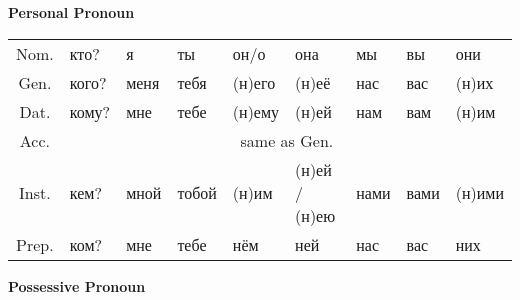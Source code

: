 \documentclass[a4paper, landscape, 11pt]{article}
\begin{document}
\strut\vfil

\begin{center}
	\Huge\bfseries Personal Pronoun
\end{center}

\begin{tabularx}{\textwidth}{|c|X|X|X|X|X|X|X|X|}
	\hline
	Nom. & кто?  & я    & ты    & он/о   & она           & мы   & вы   & они    \\ %
	Gen. & кого? & меня & тебя  & (н)его & (н)её         & нас  & вас  & (н)их  \\ %
	Dat. & кому? & мне  & тебе  & (н)ему & (н)ей         & нам  & вам  & (н)им  \\ \cline{2-9}
	Acc. &                      \multicolumn{8}{c|}{same as Gen.}                      \\ \cline{2-9}
	Inst. & кем?  & мной & тобой & (н)им  & (н)ей / (н)ею & нами & вами & (н)ими \\ %
	Prep. & ком?  & мне  & тебе  & нём    & ней           & нас  & вас  & них    \\ \hline
\end{tabularx}

\vfill

\begin{center}
	\Huge\bfseries Possessive Pronoun
\end{center}
\end{document}
